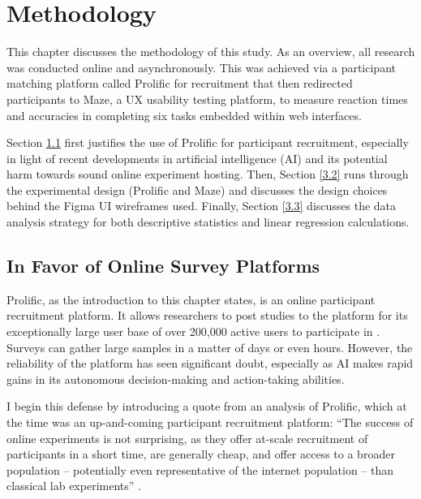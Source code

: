\documentclass[12pt,twoside]{reedthesis}
\begin{document}
        
\chapter{Methodology}\label{3}

This chapter discusses the methodology of this study. As an overview, all research was conducted online and asynchronously. This was achieved via a participant matching platform called Prolific for recruitment that then redirected participants to Maze, a UX usability testing platform, to measure reaction times and accuracies in completing six tasks embedded within web interfaces. 

Section \ref{3.1} first justifies the use of Prolific for participant recruitment, especially in light of recent developments in artificial intelligence (AI) and its potential harm towards sound online experiment hosting. Then, Section \ref{3.2} runs through the experimental design (Prolific and Maze) and discusses the design choices behind the Figma UI wireframes used. Finally, Section \ref{3.3} discusses the data analysis strategy for both descriptive statistics and linear regression calculations.

\section{In Favor of Online Survey Platforms}\label{3.1}
    Prolific, as the introduction to this chapter states, is an online participant recruitment platform. It allows researchers to post studies to the platform for its exceptionally large user base of over 200,000 active users to participate in \cite{run_prolific}. Surveys can gather large samples in a matter of days or even hours. However, the reliability of the platform has seen significant doubt, especially as AI makes rapid gains in its autonomous decision-making and action-taking abilities.

    I begin this defense by introducing a quote from an analysis of Prolific, which at the time was an up-and-coming participant recruitment platform: 
        \enquote{The success of online experiments is not surprising, as they offer at-scale recruitment of participants in a short time, are generally cheap, and offer access to a broader population – potentially even representative of the internet population – than classical lab experiments} \cite{palan_prolificacsubject_2018}.
        
\end{document}
